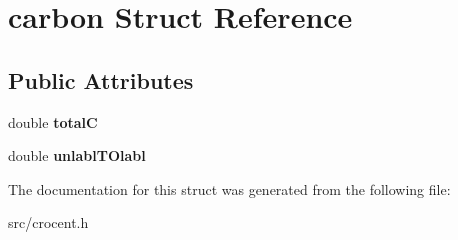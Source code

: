 \hypertarget{structcarbon}{\section{carbon Struct Reference}
\label{structcarbon}
}
\subsection*{Public Attributes}
\begin{DoxyCompactItemize}
\item 
\hypertarget{structcarbon_a1a9e39955cf1ee56521563d3c1f8a0cf}{double {\bfseries total\-C}}\label{structcarbon_a1a9e39955cf1ee56521563d3c1f8a0cf}

\item 
\hypertarget{structcarbon_a3d2bc1ad5375e4b1db192734f66921d6}{double {\bfseries unlabl\-T\-Olabl}}\label{structcarbon_a3d2bc1ad5375e4b1db192734f66921d6}

\end{DoxyCompactItemize}


The documentation for this struct was generated from the following file\-:\begin{DoxyCompactItemize}
\item 
src/crocent.\-h\end{DoxyCompactItemize}
